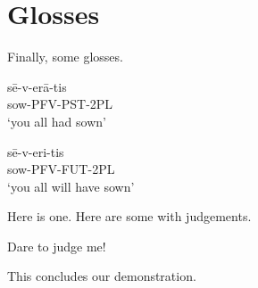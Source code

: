 \documentclass[a4paper,12pt,twoside]{article}
\begin{document}
\section{Glosses}

Finally, some glosses.

\begin{exe}

  \ex\label{ex:lat-mir-pluper}
  \gll sē-v-erā-tis \\
  sow-PFV-PST-2PL \\
  \trans \enquote*{you all had sown}

  \ex\label{ex:lat-mir-fut-per}
  \gll sē-v-eri-tis \\
  sow-PFV-FUT-2PL \\
  \trans \enquote*{you all will have sown}

\end{exe}

\begin{exe}%

  \ex\label{ex:here} Here is one. %
  \ex Here are some with judgements.
  \begin{xlist}%
    \ex %
    \begin{xlist}%
    \end{xlist}%
    \ex Dare to judge me!
  \end{xlist}%
  \ex This concludes our demonstration.

\end{exe}%

\newpage

\printbibliography[
  heading=bibintoc,
]
\thispagestyle{bib}
\end{document}
